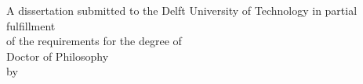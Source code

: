 \thispagestyle{empty}

\begin{titlepage}
  \begin{addmargin}[-1cm]{-3cm}
    \begin{center}
        \large  
        \hfill
        \vfill

        \begingroup
            \color{RoyalBlue}\spacedallcaps{\myTitle}
        \endgroup
        
        \vspace{5cm}
        
        A dissertation submitted to the Delft University of Technology in partial fulfillment\\ of the requirements for the degree of\\
        \vspace{2cm}
        Doctor of Philosophy\\
        \vspace{4cm}
        by\\
        \bigskip
        \myName\\
        \bigskip
        \myGraduationMonth\xspace\myGraduationYear\\

        \vfill

    \end{center}  
  \end{addmargin}       
\end{titlepage}  








